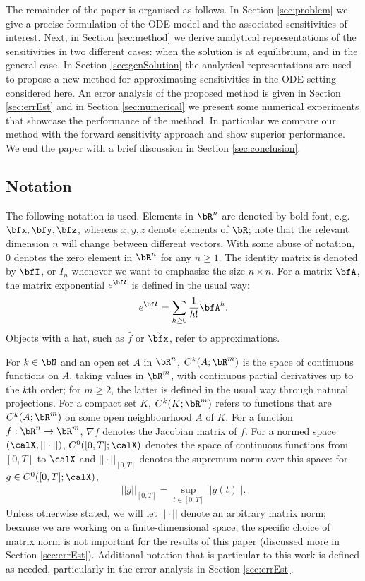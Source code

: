 \documentclass[DIV=12]{scrartcl} %
\theoremstyle{definition}
\begin{document}
The remainder of the paper is organised as follows. In Section \ref{sec:problem} we give a precise formulation of the ODE model and the associated sensitivities of interest. Next, in Section \ref{sec:method} we derive analytical representations of the sensitivities in two different cases: when the solution is at equilibrium, %
and in the general case. In Section \ref{sec:genSolution} the analytical representations are used to propose a new method for approximating sensitivities in the ODE setting considered here. An error analysis of the proposed method is given in Section \ref{sec:errEst} and in Section \ref{sec:numerical} we present some numerical experiments that showcase the performance of the method. In particular we compare our method with the forward sensitivity approach and show superior performance. We end the paper with a brief discussion in Section \ref{sec:conclusion}.

\subsection{Notation}
The following notation is used. Elements in $\bR ^n$ are denoted by bold font, e.g. $\bfx, \bfy, \bfz$, whereas $x,y,z$ denote elements of $\bR$; note that the relevant dimension $n$ will change between different vectors. With some abuse of notation, $0$ denotes the zero element in $\bR ^n$ for any $n\geq 1$. The identity matrix is denoted by $\bfI$, or $I_n$ whenever we want to emphasise the size $n \times n$. For a matrix $\bfA$, the matrix exponential $e^\bfA$ is defined in the usual way:
\[
    e^\bfA = \sum _{h \geq 0} \frac{1}{h!} \bfA ^h. 
\]
Objects with a hat, such as $\hat f$ or $\hat \bfx$, refer to approximations. 

For $k \in \bN$ and an open set $A$ in $\bR ^n$, $C^k (A;\bR^m)$ is the space of continuous functions on $A$, taking values in $\bR ^m$, with continuous partial derivatives up to the $k$th order; for $m \geq 2$, the latter is defined in the usual way through natural projections. For a compact set $K$, $C^k(K; \bR ^m)$ refers to functions that are $C^k(A; \bR ^m)$ on some open neighbourhood $A$ of $K$. For a function $f: \bR ^n \to \bR ^m$, $\nabla f$ denotes the Jacobian matrix of $f$. For a normed space $(\calX, ||\cdot||)$, $C^0([0,T];\calX)$ denotes the space of continuous functions from $[0,T]$ to $\calX$ and $||\cdot || _{[0,T]}$ denotes the supremum norm over this space: for $g \in C^0 ([0,T];\calX)$,
\begin{align*}
    ||g||_{[0,T]} = \sup _{t \in [0,T]} ||g (t) ||.
\end{align*}
%
Unless otherwise stated, we will let $|| \cdot ||$ denote an arbitrary matrix norm; because we are working on a finite-dimensional space, the specific choice of matrix norm is not important for the results of this paper (discussed more in Section \ref{sec:errEst}). 
Additional notation that is particular to this work is defined as needed, particularly in the error analysis in Section \ref{sec:errEst}.
\end{document}
